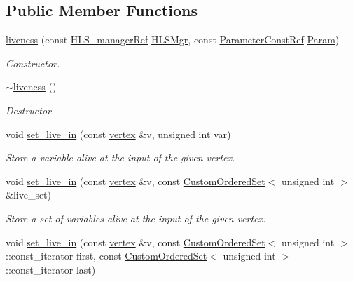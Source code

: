 \subsection*{Public Member Functions}
\begin{DoxyCompactItemize}
\item 
\hyperlink{classliveness_a6b677572ebda4ba84035251bf3e8353b}{liveness} (const \hyperlink{hls__manager_8hpp_acd3842b8589fe52c08fc0b2fcc813bfe}{H\+L\+S\+\_\+manager\+Ref} \hyperlink{classliveness_a95836be57bfe30a8957942c76dd489a9}{H\+L\+S\+Mgr}, const \hyperlink{Parameter_8hpp_a37841774a6fcb479b597fdf8955eb4ea}{Parameter\+Const\+Ref} \hyperlink{classliveness_a2b88b050331ff347cbb910b885cff259}{Param})
\begin{DoxyCompactList}\small\item\em Constructor. \end{DoxyCompactList}\item 
\hyperlink{classliveness_ad99bfcdba90d09aabd32a65e79d05f36}{$\sim$liveness} ()
\begin{DoxyCompactList}\small\item\em Destructor. \end{DoxyCompactList}\item 
void \hyperlink{classliveness_a6e7f7ae85f11dc785448d459881857af}{set\+\_\+live\+\_\+in} (const \hyperlink{graph_8hpp_abefdcf0544e601805af44eca032cca14}{vertex} \&v, unsigned int var)
\begin{DoxyCompactList}\small\item\em Store a variable alive at the input of the given vertex. \end{DoxyCompactList}\item 
void \hyperlink{classliveness_a38a6af87fd65b4b5436b983cbeca97e3}{set\+\_\+live\+\_\+in} (const \hyperlink{graph_8hpp_abefdcf0544e601805af44eca032cca14}{vertex} \&v, const \hyperlink{classCustomOrderedSet}{Custom\+Ordered\+Set}$<$ unsigned int $>$ \&live\+\_\+set)
\begin{DoxyCompactList}\small\item\em Store a set of variables alive at the input of the given vertex. \end{DoxyCompactList}\item 
void \hyperlink{classliveness_adbcc92125de5102c7c5a79627a73ddc7}{set\+\_\+live\+\_\+in} (const \hyperlink{graph_8hpp_abefdcf0544e601805af44eca032cca14}{vertex} \&v, const \hyperlink{classCustomOrderedSet}{Custom\+Ordered\+Set}$<$ unsigned int $>$\+::const\+\_\+iterator first, const \hyperlink{classCustomOrderedSet}{Custom\+Ordered\+Set}$<$ unsigned int $>$\+::const\+\_\+iterator last)

\end{DoxyCompactItemize}
